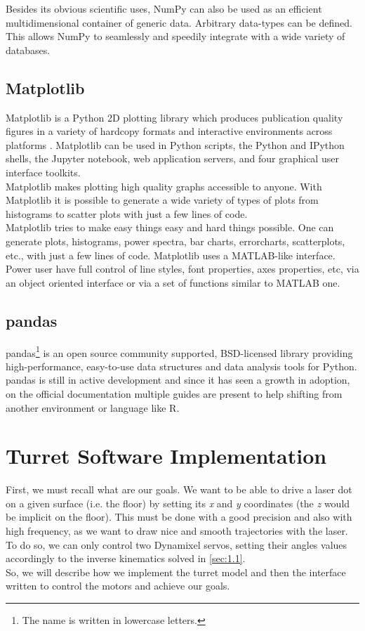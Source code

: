 Besides its obvious scientific uses, NumPy can also be used as an efficient multidimensional container of generic data. Arbitrary data-types can be defined. This allows NumPy to seamlessly and speedily integrate with a wide variety of databases.
\subsection{Matplotlib}
Matplotlib is a Python 2D plotting library which produces publication quality figures in a variety of hardcopy formats and interactive environments across platforms \cite{matplotlib}. Matplotlib can be used in Python scripts, the Python and IPython shells, the Jupyter notebook, web application servers, and four graphical user interface toolkits.\\

Matplotlib makes plotting high quality graphs accessible to anyone. With Matplotlib it is possible to generate a wide variety of types of plots from histograms to scatter plots with just a few lines of code.\\

Matplotlib tries to make easy things easy and hard things possible. One can generate plots, histograms, power spectra, bar charts, errorcharts, scatterplots, etc., with just a few lines of code. 
Matplotlib uses a MATLAB-like interface. Power user have full control of line styles, font properties, axes properties, etc, via an object oriented interface or via a set of functions similar to MATLAB one.
\subsection{pandas}
\label{sec:pandas}
pandas\footnote{The name is written in lowercase letters.} is an open source community supported, BSD-licensed library providing high-performance, easy-to-use data structures and data analysis tools for Python. pandas is still in active development and since it has seen a growth in adoption, on the official documentation multiple guides are present to help shifting from another environment or language like R.

\section{Turret Software Implementation}
First, we must recall what are our goals. We want to be able to drive a laser dot on a given surface (i.e. the floor) by setting its \emph{x} and \emph{y} coordinates (the \emph{z} would be implicit on the floor). This must be done with a good precision and also with high frequency, as we want to draw nice and smooth trajectories with the laser. To do so, we can only control two Dynamixel servos, setting their angles values accordingly to the inverse kinematics solved in \ref{sec:1.1}.\\
So, we will describe how we implement the turret model and then the interface written to control the motors and achieve our goals.
